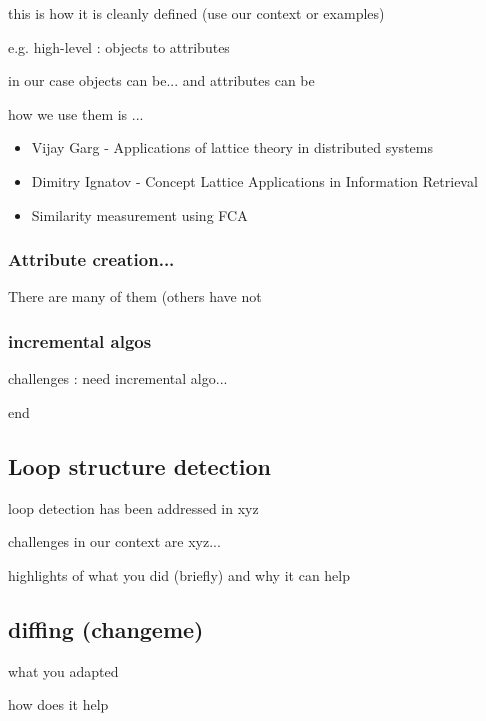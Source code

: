 this is how it is cleanly defined (use our context or examples)

e.g. high-level : objects to attributes

in our case objects can be... and attributes can be

how we use them is ...


\begin{itemize}
\item Vijay Garg - Applications of lattice theory in distributed systems

\item Dimitry Ignatov \cite{ignatov} - Concept Lattice Applications in Information Retrieval

\item \cite{clbook} \cite{clconst} \cite{bender05} \citep{latticeForDistConst} 

Similarity measurement using FCA \cite{Alqadah2011}
\end{itemize}



\subsubsection{Attribute creation...}

There are many of them (others have not 

\subsubsection{incremental algos}

challenges : need incremental algo...

end




\subsection{Loop structure detection}

loop detection has been addressed in xyz

challenges in our context are xyz...

highlights of what you did (briefly) and why it can help

\subsection{diffing (changeme)}


what you adapted

how does it help

